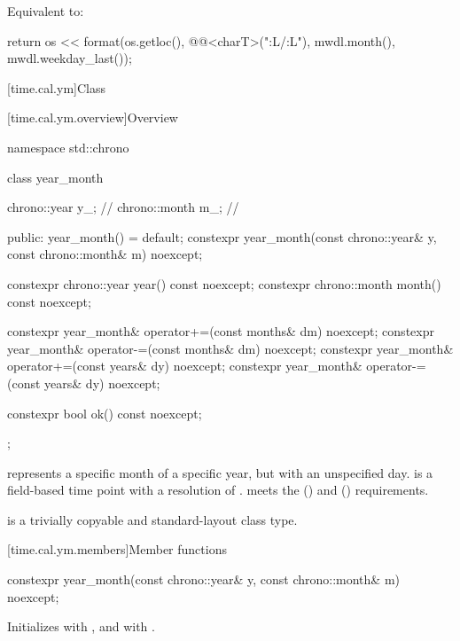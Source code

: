 \begin{itemdescr}
\pnum
\effects
Equivalent to:
\begin{codeblock}
return os << format(os.getloc(), @@<charT>("{:L}/{:L}"),
                    mwdl.month(), mwdl.weekday_last());
\end{codeblock}
\end{itemdescr}

[time.cal.ym]{Class }

[time.cal.ym.overview]{Overview}

\begin{codeblock}
namespace std::chrono {
  class year_month {
    chrono::year  y_;           // \expos
    chrono::month m_;           // \expos

  public:
    year_month() = default;
    constexpr year_month(const chrono::year& y, const chrono::month& m) noexcept;

    constexpr chrono::year  year()  const noexcept;
    constexpr chrono::month month() const noexcept;

    constexpr year_month& operator+=(const months& dm) noexcept;
    constexpr year_month& operator-=(const months& dm) noexcept;
    constexpr year_month& operator+=(const years& dy)  noexcept;
    constexpr year_month& operator-=(const years& dy)  noexcept;

    constexpr bool ok() const noexcept;
  };
}
\end{codeblock}

\pnum
{} represents a specific month of a specific year,
but with an unspecified day.
 is a field-based time point with a resolution of .
 meets the  ()
and  () requirements.

\pnum
{} is a trivially copyable and standard-layout class type.

[time.cal.ym.members]{Member functions}

%
\begin{itemdecl}
constexpr year_month(const chrono::year& y, const chrono::month& m) noexcept;
\end{itemdecl}

\begin{itemdescr}
\pnum
\effects
Initializes  with , and  with .
\end{itemdescr}

